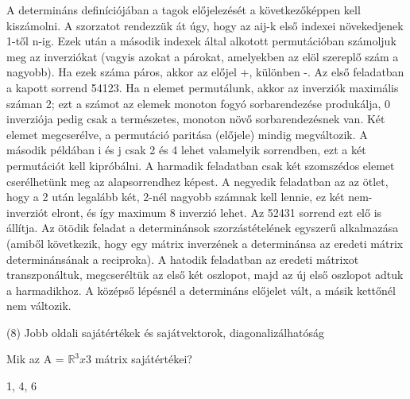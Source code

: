 \begin{frame}
  \begin{tcolorbox}[title={7/6. -R-}]
    A determináns definíciójában a tagok előjelezését a következőképpen kell kiszámolni. A szorzatot rendezzük át úgy, hogy az aij-k első indexei növekedjenek 1-től n-ig. Ezek után a második indexek által alkotott permutációban számoljuk meg az inverziókat (vagyis azokat a párokat, amelyekben az elöl szereplő szám a nagyobb). Ha ezek száma páros, akkor az előjel +, különben -. Az első feladatban a kapott sorrend 54123. Ha n elemet permutálunk, akkor az inverziók maximális száman 2; ezt a számot az elemek monoton fogyó sorbarendezése produkálja, 0 inverziója pedig csak a természetes, monoton növő sorbarendezésnek van. Két elemet megcserélve, a permutáció paritása (előjele) mindig megváltozik. A második példában i és j csak 2 és 4 lehet valamelyik sorrendben, ezt a két permutációt kell kipróbálni. A harmadik feladatban csak két szomszédos elemet cserélhetünk meg az alapsorrendhez képest. A negyedik feladatban az az ötlet, hogy a 2 után legalább két, 2-nél nagyobb számnak kell lennie, ez két nem-inverziót elront, és így maximum 8 inverzió lehet. Az 52431 sorrend ezt elő is állítja. Az ötödik feladat a determinánsok szorzástételének egyszerű alkalmazása (amiből következik, hogy egy mátrix inverzének a determinánsa az eredeti mátrix determinánsának a reciproka). A hatodik feladatban az eredeti mátrixot transzponáltuk, megcseréltük az első két oszlopot, majd az új első oszlopot adtuk a harmadikhoz. A középső lépésnél a determináns előjelet vált, a másik kettőnél nem változik.

  \end{tcolorbox}
\end{frame}


\begin{frame}[plain]
\begin{tcolorbox}[center, colback={myyellow}, coltext={black}, colframe={myyellow}]
    {\RHuge  (8) Jobb oldali sajátértékek és sajátvektorok, diagonalizálhatóság}
    \mmedskip
\end{tcolorbox}
\end{frame}

\begin{frame}
  \begin{tcolorbox}[title={8/1. -N-}]
    Mik az A = $\mathbb{R}^3x3$ mátrix sajátértékei? 

  \tcblower

    \mmedskip 
    
    1, 4, 6
  \end{tcolorbox}
\end{frame}


